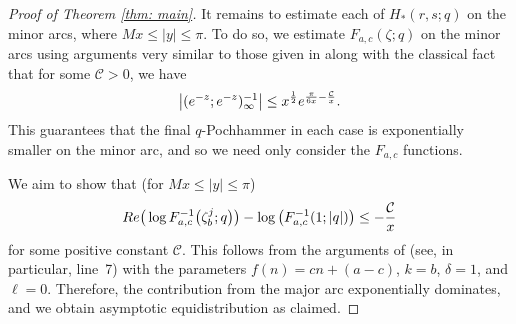 \documentclass[10pt,a4paper]{amsart}
\newcommand{\re}{\textnormal{Re}}
\numberwithin{equation}{section}
\begin{document}
\begin{proof}[Proof of Theorem \ref{thm: main}]
 It remains to estimate each of $H_*(r,s;q)$ on the minor arcs, where $Mx \le |y|\le \pi$. To do so, we estimate $F_{a,c}(\zeta;q)$ on the minor arcs using arguments very similar to those given in \cite{BCMO} along with the classical fact that for some $\mathcal{C}>0$, we have
 \begin{align*}
 \big|({\rm e}^{-z};{\rm e}^{-z})_\infty^{-1}\big| \le x^{\frac12} {\rm e}^{\frac{\pi}{6x}-\frac{\mathcal{C}}{x}}.
 \end{align*}
This guarantees that the final $q$-Pochhammer in each case is exponentially smaller on the minor arc, and so we need only consider the $F_{a,c}$ functions.

We aim to show that (for $Mx \le |y|\le \pi$)
\begin{align*}
	\re\big(\log F_{a,c}^{-1}\big(\zeta_b^j ; q \big) \big) - \log\big(F_{a,c}^{-1}(1;|q|)\big) \leq - \frac{\mathcal{C}}{x}
\end{align*}
for some positive constant $\mathcal{C}$. This follows from the arguments of \cite[p.~1962]{Zhou} (see, in particular, line~7) with the parameters $f(n) = cn+ (a-c)$, $k=b$, $\delta = 1$, and $\ell =0$. Therefore, the contribution from the major arc exponentially dominates, and we obtain asymptotic equidistribution as claimed.
\end{proof}
\end{document}
